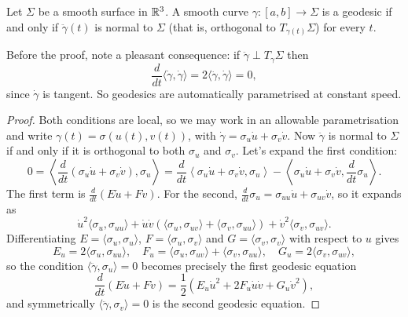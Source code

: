 \documentclass[a4paper]{scrartcl}
\begin{document}
\begin{proposition}\label{prop:geodesicnormal}
    Let $\Sigma$ be a smooth surface in $\mathbb{R}^3$. A smooth curve $\gamma : [a, b] \rightarrow \Sigma$ is a geodesic if and only if $\ddot{\gamma}(t)$ is normal to $\Sigma$ (that is, orthogonal to $T_{\gamma(t)}\Sigma$) for every $t$.
\end{proposition}

\begin{remark}
    Before the proof, note a pleasant consequence: if $\ddot\gamma \perp T_\gamma \Sigma$ then
    $$
    \frac{d}{dt}\langle \dot\gamma, \dot\gamma \rangle = 2 \langle \ddot \gamma, \dot\gamma \rangle = 0,
    $$
    since $\dot\gamma$ is tangent. So geodesics are automatically parametrised at constant speed.
\end{remark}
\begin{proof}
    Both conditions are local, so we may work in an allowable parametrisation and write $\gamma(t) = \sigma(u(t), v(t))$, with $\dot\gamma = \sigma_u \dot u + \sigma_v \dot v$. Now $\ddot\gamma$ is normal to $\Sigma$ if and only if it is orthogonal to both $\sigma_u$ and $\sigma_v$. Let's expand the first condition:
    $$
    0 = \left\langle \frac{d}{dt}\left(\sigma_u \dot u + \sigma_v \dot v\right), \sigma_u \right\rangle = \frac{d}{dt}\left\langle \sigma_u \dot u + \sigma_v \dot v, \sigma_u \right\rangle - \left\langle \sigma_u \dot u + \sigma_v \dot v, \frac{d}{dt}\sigma_u \right\rangle.
    $$
    The first term is $\frac{d}{dt}(E \dot u + F \dot v)$. For the second, $\frac{d}{dt}\sigma_u = \sigma_{uu}\dot u + \sigma_{uv} \dot v$, so it expands as
    $$
    \dot u^2 \langle \sigma_u, \sigma_{uu}\rangle + \dot u \dot v \left(\langle \sigma_u, \sigma_{uv}\rangle + \langle \sigma_v, \sigma_{uu} \rangle\right) + \dot v^2 \langle \sigma_v, \sigma_{uv} \rangle.
    $$
    Differentiating $E = \langle \sigma_u, \sigma_u\rangle$, $F = \langle \sigma_u, \sigma_v \rangle$ and $G = \langle \sigma_v, \sigma_v\rangle$ with respect to $u$ gives
    $$
    E_u = 2\langle \sigma_u, \sigma_{uu}\rangle, \quad F_u = \langle \sigma_u, \sigma_{uv}\rangle + \langle \sigma_v, \sigma_{uu} \rangle, \quad G_u = 2 \langle \sigma_v, \sigma_{uv}\rangle,
    $$
    so the condition $\langle \ddot\gamma, \sigma_u \rangle = 0$ becomes precisely the first geodesic equation
    $$
    \frac{d}{dt}(E \dot u + F \dot v) = \frac{1}{2}\left(E_u \dot u^2 + 2F_u \dot u \dot v + G_u \dot v^2\right),
    $$
    and symmetrically $\langle \ddot \gamma, \sigma_v \rangle = 0$ is the second geodesic equation.
\end{proof}
\end{document}
